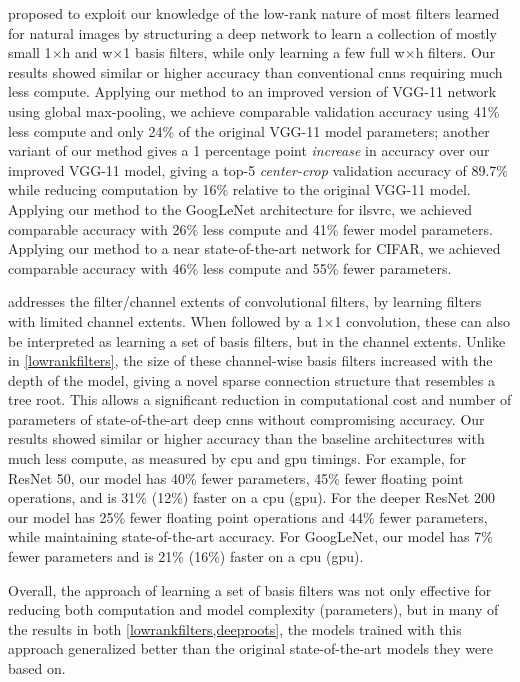 \documentclass[thesis]{subfiles}
\begin{document}
 proposed to exploit our knowledge of the low-rank nature of most filters learned for natural images by structuring a deep network to learn a collection of mostly small 1$\times$h and w$\times$1 basis filters, while only learning a few full w$\times$h filters. Our results showed similar or higher accuracy than conventional \glspl{cnn} requiring much less compute. Applying our method to an improved version of VGG-11 network using global max-pooling, we achieve comparable validation accuracy using 41\% less compute and only 24\% of the original VGG-11 model parameters; another variant of our method gives a 1 percentage point {\em increase} in accuracy over our improved VGG-11 model, giving a top-5 \emph{center-crop} validation accuracy of 89.7\% while reducing computation by 16\% relative to the original VGG-11 model. Applying our method to the GoogLeNet architecture for \gls{ilsvrc}, we achieved comparable accuracy with 26\% less compute and 41\% fewer model parameters. Applying our method to a near state-of-the-art network for CIFAR, we achieved comparable accuracy with 46\% less compute and 55\% fewer parameters. 
	
 addresses the filter/channel extents of convolutional filters, by learning filters with limited channel extents. When followed by a 1$\times$1 convolution, these can also be interpreted as learning a set of basis filters, but in the channel extents. 
Unlike in \cref{lowrankfilters}, the size of these channel-wise basis filters increased with the depth of the model, giving a novel sparse connection structure that resembles a tree root. This allows a significant reduction in computational cost and number of parameters of state-of-the-art deep \glspl{cnn} without compromising accuracy. Our results showed similar or higher accuracy than the baseline architectures with much less compute, as measured by \gls{cpu} and \gls{gpu} timings. For example, for ResNet 50, our model has 40\% fewer parameters, 45\% fewer floating point operations, and is 31\% (12\%) faster on a \gls{cpu} (\gls{gpu}). For the deeper ResNet 200 our model has 25\% fewer floating point operations and 44\% fewer parameters, while maintaining state-of-the-art accuracy. For GoogLeNet, our model has 7\% fewer parameters and is 21\% (16\%) faster on a \gls{cpu} (\gls{gpu}).

Overall, the approach of learning a set of basis filters was not only effective for reducing both computation and model complexity (parameters), but in many of the results in both \cref{lowrankfilters,deeproots}, the models trained with this approach generalized better than the original state-of-the-art models they were based on.
\end{document}
